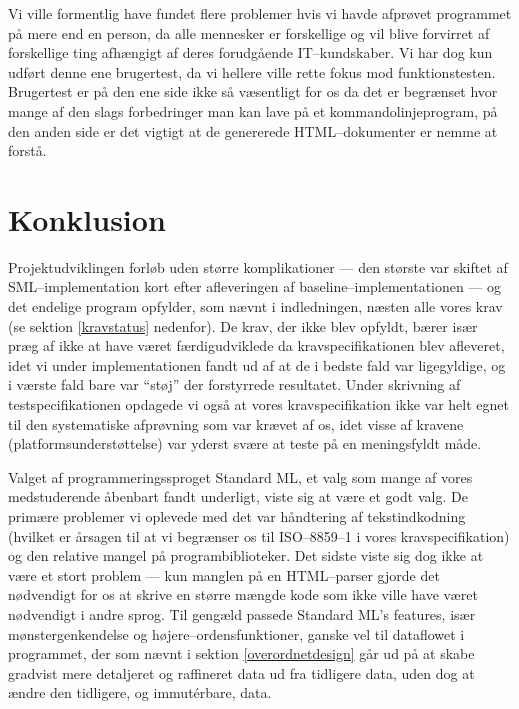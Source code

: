 \documentclass[a4paper,oneside]{memoir}
\begin{document}
Vi ville formentlig have fundet flere problemer hvis vi havde afprøvet
programmet på mere end en person, da alle mennesker er forskellige og
vil blive forvirret af forskellige ting afhængigt af deres forudgående
IT--kundskaber. Vi har dog kun udført denne ene brugertest, da vi
hellere ville rette fokus mod funktionstesten. Brugertest er på den
ene side ikke så væsentligt for os da det er begrænset hvor mange af
den slags forbedringer man kan lave på et kommandolinjeprogram, på den
anden side er det vigtigt at de genererede HTML--dokumenter er nemme
at forstå. 

\chapter{Konklusion}
\label{konklusion}

Projektudviklingen forløb uden større komplikationer --- den største
var skiftet af SML--implementation kort efter afleveringen af
baseline--implementationen --- og det endelige program opfylder, som
nævnt i indledningen, næsten alle vores krav (se sektion
\ref{kravstatus} nedenfor). De krav, der ikke blev opfyldt, bærer især
præg af ikke at have været færdigudviklede da kravspecifikationen blev
afleveret, idet vi under implementationen fandt ud af at de i bedste
fald var ligegyldige, og i værste fald bare var ``støj'' der
forstyrrede resultatet. Under skrivning af testspecifikationen
opdagede vi også at vores kravspecifikation ikke var helt egnet til
den systematiske afprøvning som var krævet af os, idet visse af
kravene (platformsunderstøttelse) var yderst svære at teste på en
meningsfyldt måde.

Valget af programmeringssproget Standard ML, et valg som mange af
vores medstuderende åbenbart fandt underligt, viste sig at være et
godt valg. De primære problemer vi oplevede med det var håndtering af
tekstindkodning (hvilket er årsagen til at vi begrænser os til
ISO--8859--1 i vores kravspecifikation) og den relative mangel på
programbiblioteker. Det sidste viste sig dog ikke at være et stort
problem --- kun manglen på en HTML--parser gjorde det nødvendigt for os
at skrive en større mængde kode som ikke ville have været nødvendigt i
andre sprog. Til gengæld passede Standard ML's features, især
mønstergenkendelse og højere--ordensfunktioner, ganske vel til
dataflowet i programmet, der som nævnt i sektion
\ref{overordnetdesign} går ud på at skabe gradvist mere detaljeret og
raffineret data ud fra tidligere data, uden dog at ændre den
tidligere, og immutérbare, data.
\end{document}
